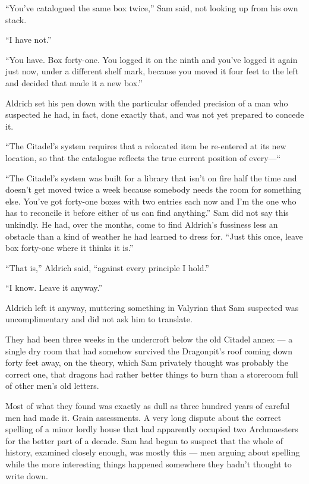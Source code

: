 “You’ve catalogued the same box twice,” Sam said, not looking up from his own stack.

“I have not.”

“You have. Box forty-one. You logged it on the ninth and you’ve logged it again just now, under a different shelf mark, because you moved it four feet to the left and decided that made it a new box.”

Aldrich set his pen down with the particular offended precision of a man who suspected he had, in fact, done exactly that, and was not yet prepared to concede it.

“The Citadel’s system requires that a relocated item be re-entered at its new location, so that the catalogue reflects the true current position of every—“

“The Citadel’s system was built for a library that isn’t on fire half the time and doesn’t get moved twice a week because somebody needs the room for something else. You’ve got forty-one boxes with two entries each now and I’m the one who has to reconcile it before either of us can find anything.” Sam did not say this unkindly. He had, over the months, come to find Aldrich’s fussiness less an obstacle than a kind of weather he had learned to dress for. “Just this once, leave box forty-one where it thinks it is.”

“That is,” Aldrich said, “against every principle I hold.”

“I know. Leave it anyway.”

Aldrich left it anyway, muttering something in Valyrian that Sam suspected was uncomplimentary and did not ask him to translate.

\sceneBreak

They had been three weeks in the undercroft below the old Citadel annex — a single dry room that had somehow survived the Dragonpit’s roof coming down forty feet away, on the theory, which Sam privately thought was probably the correct one, that dragons had rather better things to burn than a storeroom full of other men’s old letters.

Most of what they found was exactly as dull as three hundred years of careful men had made it. Grain assessments. A very long dispute about the correct spelling of a minor lordly house that had apparently occupied two Archmaesters for the better part of a decade. Sam had begun to suspect that the whole of history, examined closely enough, was mostly this — men arguing about spelling while the more interesting things happened somewhere they hadn’t thought to write down.

